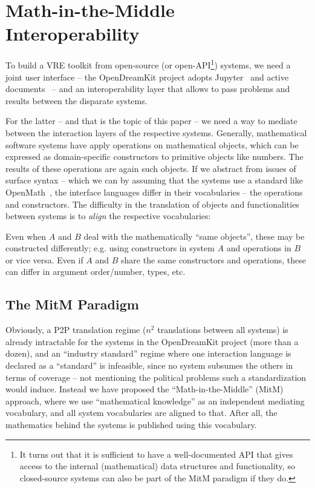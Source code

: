 \section{Math-in-the-Middle Interoperability}\label{sec:mitm}

To build a VRE toolkit from open-source (or open-API\footnote{It turns out that it is
  sufficient to have a well-documented API that gives access to the internal
  (mathematical) data structures and functionality, so closed-source systems can also be
  part of the MitM paradigm if they do.}) systems, we need a joint user interface -- the
OpenDreamKit project adopts Jupyter~\cite{jupyter-project:on} and active
documents~\cite{KohDavGin:psewads11} -- and an interoperability layer that allows to pass
problems and results between the disparate systems. 

For the latter -- and that is the topic of this paper -- we need a way to mediate between
the interaction layers of the respective systems.
Generally, mathematical software systems
have apply operations on mathematical objects, which can be expressed as domain-specific
constructors to primitive objects like numbers. The results of these operations are again
such objects. If we abstract from issues of surface syntax -- which we can by assuming
that the systems use a standard like OpenMath~\cite{BusCapCar:2oms04}, the interface
languages differ in their vocabularies -- the operations and constructors. The difficulty
in the translation of objects and functionalities between systems is to \emph{align} the
respective vocabularies:

Even when $A$ and $B$ deal with the mathematically ``same objects'',
these may be constructed differently; e.g. using constructors in
system $A$ and operations in $B$ or vice versa. Even if $A$ and $B$
share the same constructors and operations, these can differ in
argument order/number, types, etc.

\subsection{The MitM Paradigm}\label{sec:mitm:recap}

Obviously, a P2P translation regime ($n^2$ translations between all systems) is already
intractable for the systems in the OpenDreamKit project (more than a dozen), and an
``industry standard'' regime where one interaction language is declared as a ``standard''
is infeasible, since no system subsumes the others in terms of
coverage -- not mentioning the
political problems such a standardization would induce. Instead we have proposed the
``Math-in-the-Middle'' (MitM) approach, where we use ``mathematical knowledge'' as an
independent mediating vocabulary, and all system vocabularies are aligned to that. After
all, the mathematics behind the systems is published using this vocabulary.

